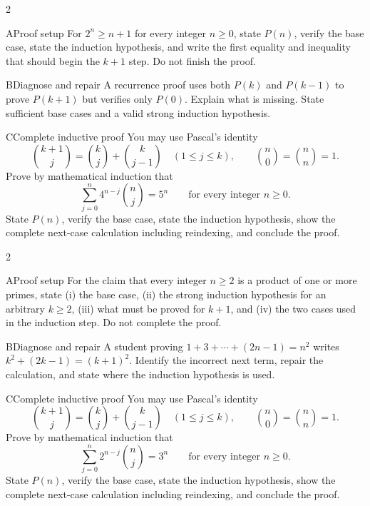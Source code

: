 \documentclass[9pt]{extarticle}
\begin{document}
\CoreWorkArea
\FormBreak
{}
\begin{multicols}{2}
\begin{CompactCoreProblem}{A}{Proof setup}
For $2^n\ge n+1$ for every integer $n\ge0$, state $P(n)$, verify the base case, state the induction hypothesis, and write the first equality and inequality that should begin the $k+1$ step. Do not finish the proof.
\end{CompactCoreProblem}
\begin{CompactCoreProblem}{B}{Diagnose and repair}
A recurrence proof uses both $P(k)$ and $P(k-1)$ to prove $P(k+1)$ but verifies only $P(0)$. Explain what is missing. State sufficient base cases and a valid strong induction hypothesis.
\end{CompactCoreProblem}
\end{multicols}
\begin{CompactCoreProblem}{C}{Complete inductive proof}
You may use Pascal's identity
\[
\binom{k+1}{j}=\binom{k}{j}+\binom{k}{j-1}
\quad(1\le j\le k),\qquad
\binom{n}{0}=\binom{n}{n}=1.
\]
Prove by mathematical induction that
\[
\sum_{j=0}^{n} 4^{n-j}\binom{n}{j}=5^n\qquad\text{for every integer }n\ge0.
\]
State $P(n)$, verify the base case, state the induction hypothesis, show the complete next-case calculation including reindexing, and conclude the proof.
\end{CompactCoreProblem}
\CoreWorkArea
\FormBreak
{}
\begin{multicols}{2}
\begin{CompactCoreProblem}{A}{Proof setup}
For the claim that every integer $n\ge2$ is a product of one or more primes, state (i) the base case, (ii) the strong induction hypothesis for an arbitrary $k\ge2$, (iii) what must be proved for $k+1$, and (iv) the two cases used in the induction step. Do not complete the proof.
\end{CompactCoreProblem}
\begin{CompactCoreProblem}{B}{Diagnose and repair}
A student proving $1+3+\cdots+(2n-1)=n^2$ writes $k^2+(2k-1)=(k+1)^2$. Identify the incorrect next term, repair the calculation, and state where the induction hypothesis is used.
\end{CompactCoreProblem}
\end{multicols}
\begin{CompactCoreProblem}{C}{Complete inductive proof}
You may use Pascal's identity
\[
\binom{k+1}{j}=\binom{k}{j}+\binom{k}{j-1}
\quad(1\le j\le k),\qquad
\binom{n}{0}=\binom{n}{n}=1.
\]
Prove by mathematical induction that
\[
\sum_{j=0}^{n} 2^{n-j}\binom{n}{j}=3^n\qquad\text{for every integer }n\ge0.
\]
State $P(n)$, verify the base case, state the induction hypothesis, show the complete next-case calculation including reindexing, and conclude the proof.
\end{CompactCoreProblem}
\end{document}
